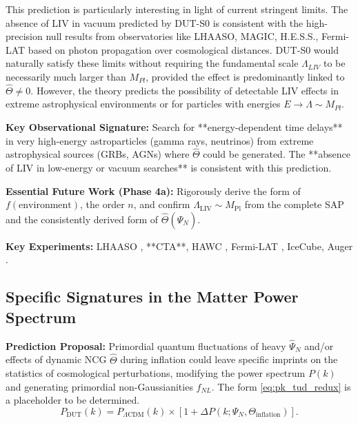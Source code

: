 \documentclass[11pt, a4paper]{article}
\theoremstyle{remark}
\newcommand{\Op}[1]{\hat{#1}}
\newcommand{\Mpl}{M_{\mathrm{Pl}}}
\begin{document}
This prediction is particularly interesting in light of current stringent limits. The absence of LIV in vacuum predicted by DUT-S0 is consistent with the high-precision null results from observatories like LHAASO, MAGIC, H.E.S.S., Fermi-LAT \citep[e.g.,][]{Lang:2019uug, LHAASO_GRB221009A_LIV, HAWC_HESS_LIV, FermiLAT_GRB090510_LIV, PierreAuger:2021tog} based on photon propagation over cosmological distances. DUT-S0 would naturally satisfy these limits without requiring the fundamental scale \( \Lambda_{LIV} \) to be necessarily much larger than \( M_{Pl} \), provided the effect is predominantly linked to \( \Op{\Theta} \neq 0 \). However, the theory predicts the possibility of detectable LIV effects in extreme astrophysical environments or for particles with energies \( E \to \Lambda \sim M_{Pl} \).

\textbf{Key Observational Signature:}
Search for **energy-dependent time delays** in very high-energy astroparticles (gamma rays, neutrinos) from extreme astrophysical sources (GRBs, AGNs) where \( \Op{\Theta} \) could be generated. The **absence of LIV in low-energy or vacuum searches** \citep{KosteleckyDataTables} is consistent with this prediction.

\textbf{Essential Future Work (Phase 4a):}
Rigorously derive the form of \( f(\text{environment}) \), the order \( n \), and confirm \( \Lambda_{\text{LIV}} \sim \Mpl \) from the complete SAP and the consistently derived form of \( \Op{\Theta}(\Op{\Psi}_N) \).

\textbf{Key Experiments:}
LHAASO \citep{LHAASO_GRB221009A_LIV}, **CTA**, HAWC \citep{HAWC_HESS_LIV}, Fermi-LAT \citep{FermiLAT_GRB090510_LIV}, IceCube, Auger \citep{PierreAuger:2021tog}.

\subsection{Specific Signatures in the Matter Power Spectrum}
\label{subsec:power_spectrum_final_revised}

\textbf{Prediction Proposal:}
Primordial quantum fluctuations of heavy \( \Op{\Psi}_N \) and/or effects of dynamic NCG \( \Op{\Theta} \) during inflation could leave specific imprints on the statistics of cosmological perturbations, modifying the power spectrum \(P(k)\) and generating primordial non-Gaussianities \( f_{NL} \). The form \eqref{eq:pk_tud_redux} is a placeholder to be determined.
\begin{equation} \label{eq:pk_tud_redux}
P_{\text{DUT}}(k) = P_{\Lambda\text{CDM}}(k) \times \left[ 1 + \Delta P(k; \Psi_N, \Theta_{\text{inflation}}) \right].
\end{equation}
\end{document}
